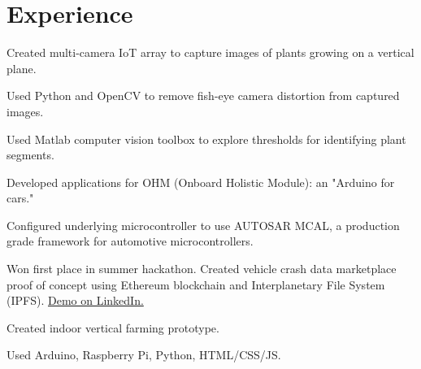 \documentclass[]{deedy-resume-openfont}
\begin{document}
\begin{minipage}[t]{0.66\textwidth} 


\section{Experience}

\vspace{\topsep} %
\begin{tightemize}
\item Created multi-camera IoT array to capture images of plants growing on a vertical plane.
\item Used Python and OpenCV to remove fish-eye camera distortion from captured images.
\item Used Matlab computer vision toolbox to explore thresholds for identifying plant segments.
\end{tightemize}
\sectionsep

\begin{tightemize}%

\item Developed applications for OHM (Onboard Holistic Module): an "Arduino for cars."
 
\item Configured underlying microcontroller to use AUTOSAR MCAL, a production grade framework for automotive microcontrollers.

\item Won first place in summer hackathon. Created vehicle crash data marketplace proof of concept using Ethereum blockchain and Interplanetary File System (IPFS). {\href {https://www.linkedin.com/in/zachbellay/}{Demo on LinkedIn.}}

\end{tightemize}
\sectionsep

\begin{tightemize}
\item Created indoor vertical farming prototype.
\item Used Arduino, Raspberry Pi, Python, HTML/CSS/JS.
\end{tightemize}
\sectionsep


\end{minipage}
\end{document}
